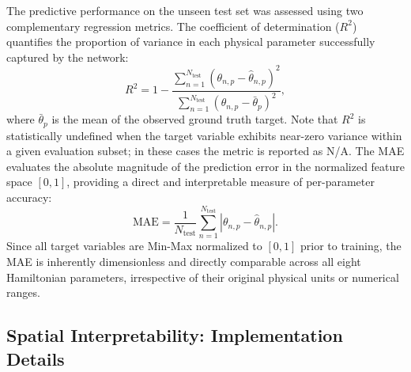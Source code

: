 \documentclass[final,5p,times,twocolumn]{elsarticle}
\begin{document}
The predictive performance on the unseen test set 
was  assessed using two complementary 
regression metrics. The coefficient of determination 
($R^2$) quantifies the proportion of variance in 
each physical parameter successfully captured by 
the network:
%
\begin{equation}\label{eq:R2}
R^2 = 1 - \frac{\sum_{n=1}^{N_{\text{test}}} 
\left(\theta_{n,p} - \hat{\theta}_{n,p}\right)^2}
{\sum_{n=1}^{N_{\text{test}}} 
\left(\theta_{n,p} - \bar{\theta}_p\right)^2},
\end{equation}
%
where $\bar{\theta}_p$ is the mean of the observed 
ground truth target. Note that $R^2$ is statistically 
undefined when the target variable exhibits near-zero 
variance within a given evaluation subset; in these 
cases the metric is reported as N/A. The MAE evaluates the absolute magnitude of the 
prediction error in the normalized feature space 
$[0,1]$, providing a direct and interpretable measure 
of per-parameter accuracy:
%
\begin{equation}\label{eq:MAE}
\text{MAE} = \frac{1}{N_{\text{test}}} 
\sum_{n=1}^{N_{\text{test}}} 
\left|\theta_{n,p} - \hat{\theta}_{n,p}\right|.
\end{equation}
%
Since all target variables are Min-Max normalized 
to $[0,1]$ prior to training, the MAE is inherently 
dimensionless and directly comparable across all 
eight Hamiltonian parameters, irrespective of their 
original physical units or numerical ranges.

\subsection{Spatial Interpretability: Implementation Details}\label{sec:spatial_exp}
\end{document}
